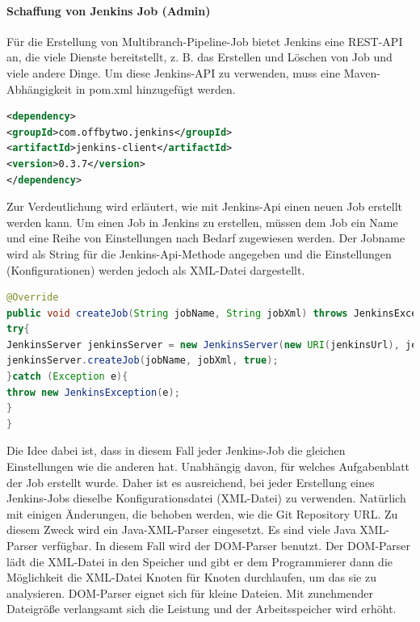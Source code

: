 \documentclass[a4paper,12pt,oneside]{book}
\begin{document}
\paragraph{Schaffung von Jenkins Job (Admin)}
Für die Erstellung von Multibranch-Pipeline-Job bietet Jenkins eine REST-API an, die viele Dienste bereitstellt, z. B. das Erstellen und Löschen von Job und viele andere Dinge. Um diese Jenkins-API zu verwenden, muss eine Maven-Abhängigkeit in pom.xml hinzugefügt werden.
\begin{lstlisting}[language=XML,caption=pom.xml - Jenkins-Api]
<dependency>
<groupId>com.offbytwo.jenkins</groupId>
<artifactId>jenkins-client</artifactId>
<version>0.3.7</version>
</dependency>
\end{lstlisting}
Zur Verdeutlichung wird erläutert, wie mit Jenkins-Api einen neuen Job erstellt werden kann. Um einen Job in Jenkins zu erstellen, müssen dem Job  ein Name und eine Reihe von Einstellungen nach Bedarf  zugewiesen werden.
\newline
Der Jobname wird als String  für die Jenkins-Api-Methode angegeben und die Einstellungen (Konfigurationen) werden jedoch als XML-Datei dargestellt.
\begin{lstlisting}[language=JAVA,caption=JenkinsServiceImp - createJob]
@Override
public void createJob(String jobName, String jobXml) throws JenkinsException {
try{
JenkinsServer jenkinsServer = new JenkinsServer(new URI(jenkinsUrl), jenkinsUser, jenkinsPassword);
jenkinsServer.createJob(jobName, jobXml, true);
}catch (Exception e){
throw new JenkinsException(e);
} 
}
\end{lstlisting}
Die Idee dabei ist, dass in diesem Fall jeder Jenkins-Job die gleichen Einstellungen wie die anderen hat. Unabhängig davon, für welches Aufgabenblatt der Job erstellt wurde. Daher ist es ausreichend, bei jeder Erstellung eines Jenkins-Jobs dieselbe Konfigurationsdatei (XML-Datei) zu verwenden. Natürlich mit einigen Änderungen, die behoben werden, wie die Git Repository URL. Zu diesem Zweck wird ein Java-XML-Parser eingesetzt. Es sind viele Java XML-Parser verfügbar. In diesem Fall wird der DOM-Parser benutzt. Der DOM-Parser lädt die XML-Datei in den Speicher und gibt er dem Programmierer dann die Möglichkeit die XML-Datei Knoten für Knoten durchlaufen, um das sie zu analysieren. DOM-Parser eignet sich für kleine Dateien. Mit zunehmender Dateigröße verlangsamt sich die Leistung und der Arbeitsspeicher wird erhöht.
\end{document}
